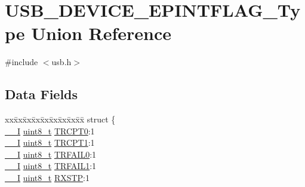 \hypertarget{union_u_s_b___d_e_v_i_c_e___e_p_i_n_t_f_l_a_g___type}{}\section{U\+S\+B\+\_\+\+D\+E\+V\+I\+C\+E\+\_\+\+E\+P\+I\+N\+T\+F\+L\+A\+G\+\_\+\+Type Union Reference}
\label{union_u_s_b___d_e_v_i_c_e___e_p_i_n_t_f_l_a_g___type}


{\ttfamily \#include $<$usb.\+h$>$}

\subsection*{Data Fields}
\begin{DoxyCompactItemize}
\item 
\begin{tabbing}
xx\=xx\=xx\=xx\=xx\=xx\=xx\=xx\=xx\=\kill
struct \{\\
\>\mbox{\hyperlink{core__cm0plus_8h_af63697ed9952cc71e1225efe205f6cd3}{\_\_I}} \mbox{\hyperlink{union_u_s_b___d_e_v_i_c_e___e_p_i_n_t_f_l_a_g___type_a5b4208c6f4c4a4290c4f2804d1eb1d5b}{uint8\_t}} \mbox{\hyperlink{union_u_s_b___d_e_v_i_c_e___e_p_i_n_t_f_l_a_g___type_a35abeb4415a3f78c80da9ad7b820fdc0}{TRCPT0}}:1\\
\>\mbox{\hyperlink{core__cm0plus_8h_af63697ed9952cc71e1225efe205f6cd3}{\_\_I}} \mbox{\hyperlink{union_u_s_b___d_e_v_i_c_e___e_p_i_n_t_f_l_a_g___type_a5b4208c6f4c4a4290c4f2804d1eb1d5b}{uint8\_t}} \mbox{\hyperlink{union_u_s_b___d_e_v_i_c_e___e_p_i_n_t_f_l_a_g___type_a96d54fd41ad99b8c9b4d7af4e1acf14d}{TRCPT1}}:1\\
\>\mbox{\hyperlink{core__cm0plus_8h_af63697ed9952cc71e1225efe205f6cd3}{\_\_I}} \mbox{\hyperlink{union_u_s_b___d_e_v_i_c_e___e_p_i_n_t_f_l_a_g___type_a5b4208c6f4c4a4290c4f2804d1eb1d5b}{uint8\_t}} \mbox{\hyperlink{union_u_s_b___d_e_v_i_c_e___e_p_i_n_t_f_l_a_g___type_a33d2a8cf0e49f63073facc24c4b26f06}{TRFAIL0}}:1\\
\>\mbox{\hyperlink{core__cm0plus_8h_af63697ed9952cc71e1225efe205f6cd3}{\_\_I}} \mbox{\hyperlink{union_u_s_b___d_e_v_i_c_e___e_p_i_n_t_f_l_a_g___type_a5b4208c6f4c4a4290c4f2804d1eb1d5b}{uint8\_t}} \mbox{\hyperlink{union_u_s_b___d_e_v_i_c_e___e_p_i_n_t_f_l_a_g___type_a3da850acd58a1e4e0035339f3a524e87}{TRFAIL1}}:1\\
\>\mbox{\hyperlink{core__cm0plus_8h_af63697ed9952cc71e1225efe205f6cd3}{\_\_I}} \mbox{\hyperlink{union_u_s_b___d_e_v_i_c_e___e_p_i_n_t_f_l_a_g___type_a5b4208c6f4c4a4290c4f2804d1eb1d5b}{uint8\_t}} \mbox{\hyperlink{union_u_s_b___d_e_v_i_c_e___e_p_i_n_t_f_l_a_g___type_ac85f883fd1f37fd4c288bec6b5e9fc03}{RXSTP}}:1\\

\end{tabbing}
\end{DoxyCompactItemize}

